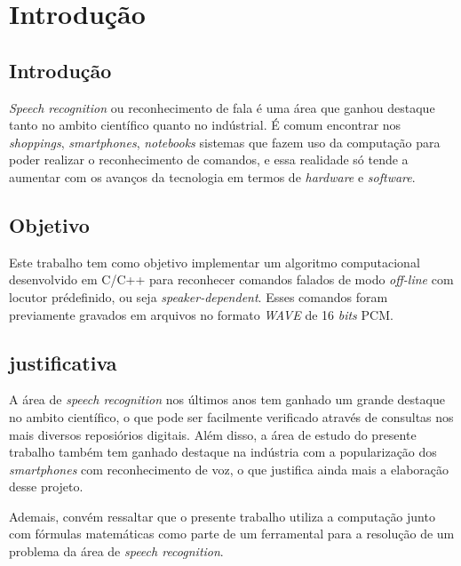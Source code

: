 \documentclass[a4paper,12pt,twoside,openright]{report}
\begin{document}
\chapter{Introdu\c{c}\~{a}o}
\thispagestyle{myheadings}
\pagestyle{myheadings}
\section{Introdu\c{c}\~{a}o}
\label{cap1}
\par \textit{Speech recognition} ou reconhecimento de fala \'{e} uma \'{a}rea que ganhou destaque tanto no ambito cient\'{i}fico quanto no ind\'{u}strial. \'{E} comum encontrar nos \textit{shoppings}, \textit{smartphones}, \textit{notebooks} sistemas que fazem uso da computa{\c c}\~{a}o para poder realizar o reconhecimento de comandos, e essa realidade s\'{o} tende a aumentar com os avan{\c c}os da tecnologia em termos de \textit{hardware} e \textit{software}.

\section{Objetivo}
\par Este trabalho tem como objetivo implementar um algoritmo computacional desenvolvido em C/C++ para reconhecer comandos falados de modo \textit{off-line} com locutor pr\'{e}definido, ou seja \textit{speaker-dependent}. Esses comandos foram previamente gravados em arquivos no formato \textit{WAVE} de 16 \textit{bits} PCM.

\section{justificativa}
\par A \'{a}rea de \textit{speech recognition} nos \'{u}ltimos anos tem ganhado um grande destaque no ambito cient\'{i}fico, o que pode ser facilmente verificado atrav\'{e}s de consultas nos mais diversos reposi\'{o}rios digitais. Al\'{e}m disso, a \'{a}rea de estudo do presente trabalho tamb\'{e}m tem ganhado destaque na ind\'{u}stria com a populariza{\c c}\~{a}o dos \textit{smartphones} com reconhecimento de voz, o que justifica ainda mais a elabora{\c c}\~{a}o desse projeto.
\par Ademais, conv\'{e}m ressaltar que o presente trabalho utiliza a computa{\c c}\~{a}o junto com f\'{o}rmulas matem\'{a}ticas como parte de um ferramental para a resolu{\c c}\~{a}o de um problema da \'{a}rea de \textit{speech recognition}. 
\end{document}
